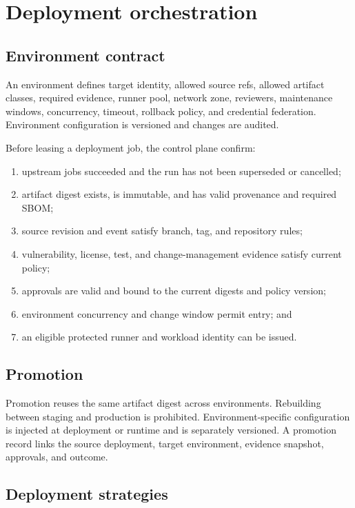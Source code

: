 \section{Deployment orchestration}

\subsection{Environment contract}

An environment defines target identity, allowed source refs, allowed artifact classes,
required evidence, runner pool, network zone, reviewers, maintenance windows,
concurrency, timeout, rollback policy, and credential federation. Environment
configuration is versioned and changes are audited.

Before leasing a deployment job, the control plane \must confirm:

\begin{enumerate}
  \item upstream jobs succeeded and the run has not been superseded or cancelled;
  \item artifact digest exists, is immutable, and has valid provenance and required SBOM;
  \item source revision and event satisfy branch, tag, and repository rules;
  \item vulnerability, license, test, and change-management evidence satisfy current policy;
  \item approvals are valid and bound to the current digests and policy version;
  \item environment concurrency and change window permit entry; and
  \item an eligible protected runner and workload identity can be issued.
\end{enumerate}

\subsection{Promotion}

Promotion reuses the same artifact digest across environments. Rebuilding between
staging and production is prohibited. Environment-specific configuration is injected
at deployment or runtime and is separately versioned. A promotion record links the
source deployment, target environment, evidence snapshot, approvals, and outcome.

\subsection{Deployment strategies}

